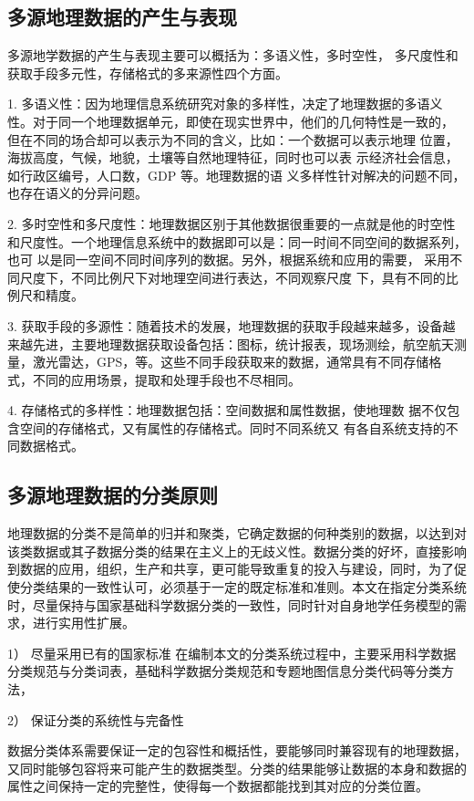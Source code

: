 \documentclass[master]{njnuthesis}
\begin{document}
\subsection{多源地理数据的产生与表现}
多源地学数据的产生与表现主要可以概括为：多语义性，多时空性，
多尺度性和获取手段多元性，存储格式的多来源性四个方面。

1. 多语义性：因为地理信息系统研究对象的多样性，决定了地理数据的多语义
性。对于同一个地理数据单元，即使在现实世界中，他们的几何特性是一致的，
但在不同的场合却可以表示为不同的含义，比如：一个数据可以表示地理
位置，海拔高度，气候，地貌，土壤等自然地理特征，同时也可以表
示经济社会信息，如行政区编号，人口数，GDP 等。地理数据的语
义多样性针对解决的问题不同，也存在语义的分异问题。

2. 多时空性和多尺度性：地理数据区别于其他数据很重要的一点就是他的时空性和尺度性。一个地理信息系统中的数据即可以是：同一时间不同空间的数据系列，也可
以是同一空间不同时间序列的数据。另外，根据系统和应用的需要，
采用不同尺度下，不同比例尺下对地理空间进行表达，不同观察尺度
下，具有不同的比例尺和精度。

3. 获取手段的多源性：随着技术的发展，地理数据的获取手段越来越多，设备越来越先进，主要地理数据获取设备包括：图标，统计报表，现场测绘，航空航天测量，激光雷达，GPS，等。这些不同手段获取来的数据，通常具有不同存储格式，不同的应用场景，提取和处理手段也不尽相同。

4. 存储格式的多样性：地理数据包括：空间数据和属性数据，使地理数
据不仅包含空间的存储格式，又有属性的存储格式。同时不同系统又
有各自系统支持的不同数据格式。

\subsection{多源地理数据的分类原则}
地理数据的分类不是简单的归并和聚类，它确定数据的何种类别的数据，以达到对该类数据或其子数据分类的结果在主义上的无歧义性。数据分类的好坏，直接影响到数据的应用，组织，生产和共享，更可能导致重复的投入与建设，同时，为了促使分类结果的一致性认可，必须基于一定的既定标准和准则。本文在指定分类系统时，尽量保持与国家基础科学数据分类的一致性，同时针对自身地学任务模型的需求，进行实用性扩展。

1）	尽量采用已有的国家标准
在编制本文的分类系统过程中，主要采用科学数据分类规范与分类词表，基础科学数据分类规范和专题地图信息分类代码等分类方法，

2）	保证分类的系统性与完备性

数据分类体系需要保证一定的包容性和概括性，要能够同时兼容现有的地理数据，又同时能够包容将来可能产生的数据类型。分类的结果能够让数据的本身和数据的属性之间保持一定的完整性，使得每一个数据都能找到其对应的分类位置。
\end{document}
